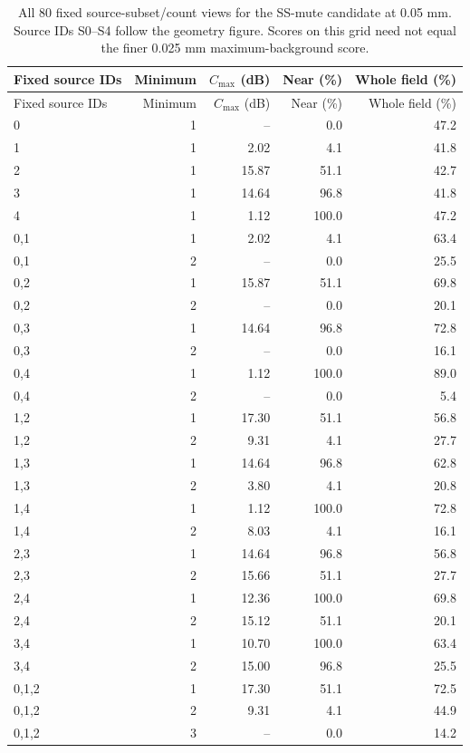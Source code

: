 \documentclass[11pt]{article}
\begin{document}
\begingroup\small\setlength{\tabcolsep}{3pt}
\begin{longtable}{@{}lrrrr@{}}
\caption{All 80 fixed source-subset/count views for the SS-mute candidate at 0.05 mm. Source IDs S0--S4 follow the geometry figure. Scores on this grid need not equal the finer 0.025 mm maximum-background score.}\label{saft:source_register}\\
\toprule Fixed source IDs & Minimum & $C_{\max}$ (dB) & Near (\%) & Whole field (\%)\\\midrule\endfirsthead
\toprule Fixed source IDs & Minimum & $C_{\max}$ (dB) & Near (\%) & Whole field (\%)\\\midrule\endhead
0 & 1 & -- & 0.0 & 47.2\\
1 & 1 & 2.02 & 4.1 & 41.8\\
2 & 1 & 15.87 & 51.1 & 42.7\\
3 & 1 & 14.64 & 96.8 & 41.8\\
4 & 1 & 1.12 & 100.0 & 47.2\\
0,1 & 1 & 2.02 & 4.1 & 63.4\\
0,1 & 2 & -- & 0.0 & 25.5\\
0,2 & 1 & 15.87 & 51.1 & 69.8\\
0,2 & 2 & -- & 0.0 & 20.1\\
0,3 & 1 & 14.64 & 96.8 & 72.8\\
0,3 & 2 & -- & 0.0 & 16.1\\
0,4 & 1 & 1.12 & 100.0 & 89.0\\
0,4 & 2 & -- & 0.0 & 5.4\\
1,2 & 1 & 17.30 & 51.1 & 56.8\\
1,2 & 2 & 9.31 & 4.1 & 27.7\\
1,3 & 1 & 14.64 & 96.8 & 62.8\\
1,3 & 2 & 3.80 & 4.1 & 20.8\\
1,4 & 1 & 1.12 & 100.0 & 72.8\\
1,4 & 2 & 8.03 & 4.1 & 16.1\\
2,3 & 1 & 14.64 & 96.8 & 56.8\\
2,3 & 2 & 15.66 & 51.1 & 27.7\\
2,4 & 1 & 12.36 & 100.0 & 69.8\\
2,4 & 2 & 15.12 & 51.1 & 20.1\\
3,4 & 1 & 10.70 & 100.0 & 63.4\\
3,4 & 2 & 15.00 & 96.8 & 25.5\\
0,1,2 & 1 & 17.30 & 51.1 & 72.5\\
0,1,2 & 2 & 9.31 & 4.1 & 44.9\\
0,1,2 & 3 & -- & 0.0 & 14.2\\

\end{longtable}
\end{document}
